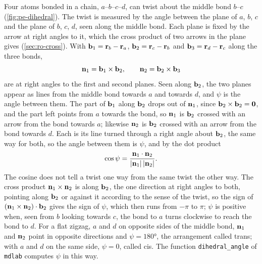 Four atoms bonded in a chain, $a$--$b$--$c$--$d$, can twist about the
middle bond $b$--$c$ (\cref{fig:pe-dihedral}). The twist is measured by
the angle between the plane of $a$, $b$, $c$ and the plane of $b$, $c$,
$d$, seen along the middle bond. Each plane is fixed by the arrow at right
angles to it, which the cross product of two arrows in the plane gives
(\cref{sec:ro-cross}). With $\bm{\mathrm{b}}_1 = \bm{\mathrm{r}}_b - \bm{\mathrm{r}}_a$, $\bm{\mathrm{b}}_2 =
\bm{\mathrm{r}}_c - \bm{\mathrm{r}}_b$ and $\bm{\mathrm{b}}_3 = \bm{\mathrm{r}}_d - \bm{\mathrm{r}}_c$ along the
three bonds,
\begin{equation*}
   \bm{\mathrm{n}}_1 = \bm{\mathrm{b}}_1\times\bm{\mathrm{b}}_2 , \qquad
   \bm{\mathrm{n}}_2 = \bm{\mathrm{b}}_2\times\bm{\mathrm{b}}_3
\end{equation*}
are at right angles to the first and second planes. Seen along
$\bm{\mathrm{b}}_2$, the two planes appear as lines from the middle bond towards
$a$ and towards $d$, and $\psi$ is the angle between them. The part of
$\bm{\mathrm{b}}_1$ along $\bm{\mathrm{b}}_2$ drops out of $\bm{\mathrm{n}}_1$, since $\bm{\mathrm{b}}_2\times
\bm{\mathrm{b}}_2 = \bm{\mathrm{0}}$, and the part left points from $a$ towards the bond, so
$\bm{\mathrm{n}}_1$ is $\bm{\mathrm{b}}_2$ crossed with an arrow from the bond towards $a$;
likewise $\bm{\mathrm{n}}_2$ is $\bm{\mathrm{b}}_2$ crossed with an arrow from the bond
towards $d$. Each is its line turned through a right angle about
$\bm{\mathrm{b}}_2$, the same way for both, so the angle between them is $\psi$,
and by the dot product
\begin{equation}
   \cos\psi = \frac{\bm{\mathrm{n}}_1\cdot\bm{\mathrm{n}}_2}{\lvert\bm{\mathrm{n}}_1\rvert\,
   \lvert\bm{\mathrm{n}}_2\rvert} .
   \label{eq:pe-dihedral}
\end{equation}
The cosine does not tell a twist one way from the same twist the other
way. The cross product $\bm{\mathrm{n}}_1\times\bm{\mathrm{n}}_2$ is along $\bm{\mathrm{b}}_2$, the
one direction at right angles to both, pointing along $\bm{\mathrm{b}}_2$ or
against it according to the sense of the twist, so the sign of
$(\bm{\mathrm{n}}_1\times\bm{\mathrm{n}}_2)\cdot\bm{\mathrm{b}}_2$ gives the sign of $\psi$, which
then runs from $-\pi$ to $\pi$; $\psi$ is positive when, seen from $b$
looking towards $c$, the bond to $a$ turns clockwise to reach the bond to
$d$. For a flat zigzag, $a$ and $d$ on
opposite sides of the middle bond, $\bm{\mathrm{n}}_1$ and $\bm{\mathrm{n}}_2$ point in
opposite directions and $\psi = \ang{180}$, the arrangement called
trans; with $a$ and $d$ on the same side, $\psi = 0$, called cis. The
function \texttt{dihedral\_angle} of \texttt{mdlab} computes $\psi$ in
this way.

